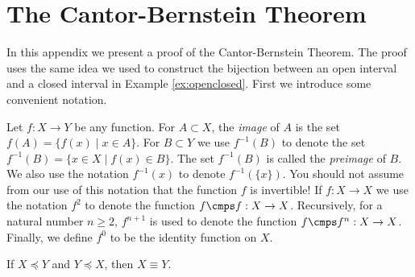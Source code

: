 \chapter{The Cantor-Bernstein Theorem}

In this appendix we present a proof of the Cantor-Bernstein Theorem.
The proof uses the same idea we used to construct the bijection between
an open interval and a closed interval in Example \ref{ex:openclosed}.
First we introduce some convenient notation.

Let $f:X\to Y$ be any function. For $A\subset X$, the \emph{image} of
$A$ is the set $f(A)=\{ f(x)\mid x\in A\}$. For $B\subset Y$ we use
$f^{-1}(B)$ to denote the set $f^{-1}(B)=\{ x\in X\mid f(x)\in B\}$. The
set $f^{-1}(B)$ is called the \emph{preimage} of $B$.  We also use the
notation $f^{-1}(x)$ to denote $f^{-1}(\{x\})$.  You should not assume
from our use of this notation that the function $f$ is invertible!
If $f:X\to X$ we use the notation $f^2$ to denote the function
$f\cmps f:X\to X$.  Recursively, for a natural number $n\geq2$,
$f^{n+1}$ is used to denote the function $f\cmps f^n:X\to X$.  Finally,
we define $f^0$ to be the identity function on $X$.

\begin{falsethrm}
If $X\preceq Y$ and $Y\preceq X$, then $X\equiv Y$.
\end{falsethrm}

